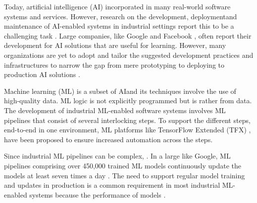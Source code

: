 Today, artificial intelligence (AI) \DIFdelbegin {}\DIFdelend \DIFaddbegin {}\DIFaddend incorporated in many real-world software systems and services. However, research on the development, deployment\DIFaddbegin \DIFadd{, }\DIFaddend and maintenance of AI-enabled systems in industrial settings report this to be a challenging task \cite{Sculley2015, Lwakatare2019}. Large companies, like Google \cite{Baylor2017} and Facebook \cite{Hazelwood2018Facebook}, often report their development \DIFdelbegin {}\DIFdelend \DIFaddbegin {}\DIFaddend for AI solutions that are useful for learning. However, many organizations are yet to adopt and tailor the suggested development practices and infrastructures to narrow the gap from mere prototyping to deploying to production AI solutions \cite{Serban2020Practices}. 

Machine learning (ML) is a subset of AI\DIFaddbegin \DIFadd{, }\DIFaddend and its techniques involve the use of high-quality data. \DIFdelbegin {}\DIFdelend ML logic is not explicitly programmed but is rather \DIFdelbegin {}\DIFdelend \DIFaddbegin {}\DIFaddend from data. The development of industrial ML-enabled software systems involves ML pipelines that consist of several interlocking steps. To support the different steps, end-to-end in one environment, ML platforms like TensorFlow Extended (TFX) \cite{Baylor2017}, have been proposed to ensure increased automation across the steps.

Since industrial ML pipelines can be complex, \DIFdelbegin {}\DIFdelend \DIFaddbegin {}\DIFaddend . In a large \DIFdelbegin {}\DIFdelend \DIFaddbegin {}\DIFaddend like Google, \DIFdelbegin {}\DIFdelend \DIFaddbegin {} ML pipelines comprising \DIFdelbegin {}\DIFdelend over 450,000 trained ML models continuously update the models at least seven times a day  \cite{Doris2021MLPipelines}. %
The need to support regular model training and updates in production is a common requirement in most industrial ML-enabled systems because \DIFdelbegin {}\DIFdelend the performance of models \DIFdelbegin {}\DIFdelend \DIFaddbegin {}\DIFaddend \cite{Sculley2015}.

